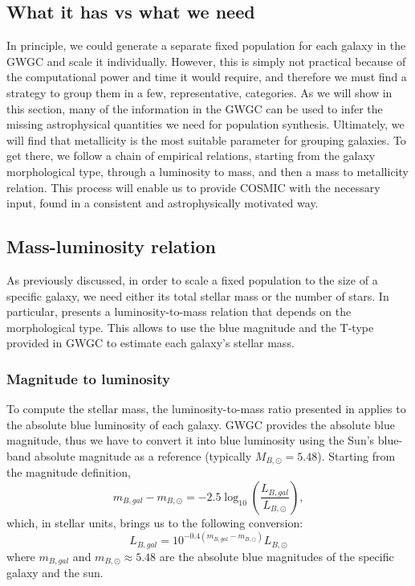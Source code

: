 \subsection{What it has vs what we need}
In principle, we could generate a separate fixed population for each galaxy in the GWGC and scale it individually.
However, this is simply not practical because of the computational power and time it would require, and therefore we must find a strategy to group them in a few, representative, categories.
As we will show in this section, many of the information in the GWGC can be used to infer the missing astrophysical quantities we need for population synthesis. 
Ultimately, we will find that metallicity is the most suitable parameter for grouping galaxies.
To get there, we follow a chain of empirical relations, starting from the galaxy morphological type, through  a luminosity to mass, and then a mass to metallicity relation. 
This process will enable us to provide COSMIC with the necessary input, found in a consistent and astrophysically motivated way.



\subsection{Mass-luminosity relation}

As previously discussed, in order to scale a fixed population to the size of a specific galaxy, we need either its total stellar mass or the number of stars.
In particular, \cite{Faber&Gallagher} presents a luminosity-to-mass relation that depends on the morphological type.
This allows to use the blue magnitude and the T-type provided in GWGC to estimate each galaxy's stellar mass.

\subsubsection{Magnitude to luminosity}
To compute the stellar mass, the luminosity-to-mass ratio presented in \cite{Faber&Gallagher} applies to the absolute blue luminosity of each galaxy.
GWGC provides the absolute blue magnitude, thus we have to convert it into blue luminosity using the Sun's blue-band absolute magnitude as a reference (typically $M_{B,\odot} = 5.48$).
Starting from the magnitude definition,
\[
    m_{B,gal} - m_{B,\odot} = -2.5\log_10\left(\frac{L_{B,gal}}{L_{B,\odot}}\right),
\]
which, in stellar units, brings us to the following conversion:
\begin{equation}
    L_{B,gal} = 10^{-0.4(m_{B,gal}-m_{B,\odot})}L_{B,\odot}
    \label{eq: magnitude to luminosity}
\end{equation}
where $m_{B,gal}$ and $m_{B,\odot}\approx 5.48$ are the absolute blue magnitudes of the specific galaxy and the sun.


